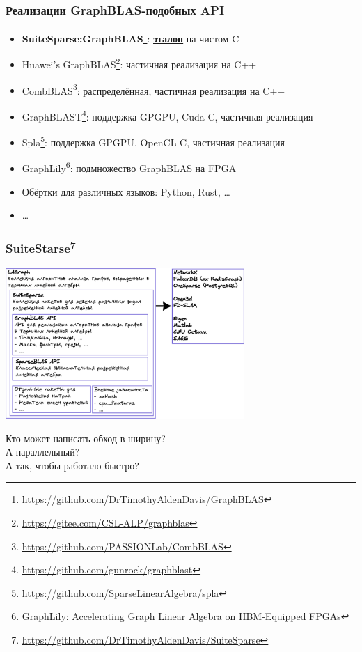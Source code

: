 \documentclass[xcolor=table,aspectratio=169]{beamer}
\begin{document}
\begin{frame}[fragile]
  \frametitle{Реализации GraphBLAS-подобных API}
  \begin{itemize}
      \item \textbf{SuiteSparse:GraphBLAS}\footnote{\url{https://github.com/DrTimothyAldenDavis/GraphBLAS}}: \underline{\textbf{эталон}} на чистом C
      \item Huawei's GraphBLAS\footnote{\url{https://gitee.com/CSL-ALP/graphblas}}: частичная реализация на C++
      \item CombBLAS\footnote{\url{https://github.com/PASSIONLab/CombBLAS}}: распределённая, частичная реализация на C++
      \item GraphBLAST\footnote{\url{https://github.com/gunrock/graphblast}}: поддержка GPGPU, Cuda C, частичная реализация
      \item Spla\footnote{\url{https://github.com/SparseLinearAlgebra/spla}}: поддержка GPGPU, OpenCL C, частичная реализация
      \item GraphLily\footnote{\href{https://dl.acm.org/doi/10.1109/ICCAD51958.2021.9643582}{GraphLily: Accelerating Graph Linear Algebra on HBM-Equipped FPGAs}}: подмножество GraphBLAS на FPGA
      \item Обёртки для различных языков: Python, Rust, \ldots
      \item \ldots
  \end{itemize}
\end{frame}

\begin{frame}[fragile]
  \frametitle{SuiteStarse\footnote{\url{https://github.com/DrTimothyAldenDavis/SuiteSparse}}}
  \begin{center}
      \includegraphics[width=0.68\textwidth]{pictures/SuiteSparse.pdf}
  \end{center}
\end{frame}

\begin{frame}
  \begin{center}
    {\huge Кто может написать обход в ширину?}
     \\
     А параллельный?
     \\
     {\tiny А так, чтобы работало быстро?}
  \end{center}
\end{frame}
\end{document}
